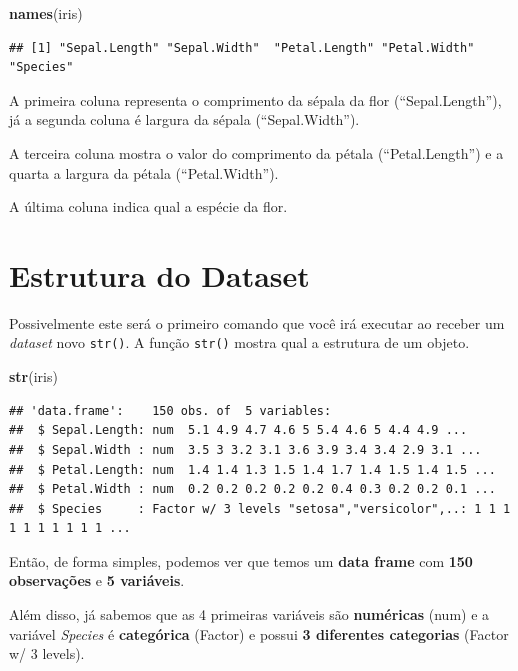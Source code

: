 \documentclass[
]{book}
\newenvironment{Shaded}{\begin{snugshade}}{\end{snugshade}}
\newcommand{\KeywordTok}[1]{\textcolor[rgb]{0.13,0.29,0.53}{\textbf{#1}}}
\newcommand{\NormalTok}[1]{#1}
\begin{document}
\begin{Shaded}
\begin{Highlighting}[]
\KeywordTok{names}\NormalTok{(iris)}
\end{Highlighting}
\end{Shaded}

\begin{verbatim}
## [1] "Sepal.Length" "Sepal.Width"  "Petal.Length" "Petal.Width"  "Species"
\end{verbatim}

A primeira coluna representa o comprimento da sépala da flor
(``Sepal.Length''), já a segunda coluna é largura da sépala
(``Sepal.Width'').

A terceira coluna mostra o valor do comprimento da pétala
(``Petal.Length'') e a quarta a largura da pétala (``Petal.Width'').

A última coluna indica qual a espécie da flor.

\hypertarget{estrutura-do-dataset}{%
\section{Estrutura do Dataset}\label{estrutura-do-dataset}}

Possivelmente este será o primeiro comando que você irá executar ao
receber um \emph{dataset} novo \texttt{str()}. A função \texttt{str()}
mostra qual a estrutura de um objeto.

\begin{Shaded}
\begin{Highlighting}[]
\KeywordTok{str}\NormalTok{(iris)}
\end{Highlighting}
\end{Shaded}

\begin{verbatim}
## 'data.frame':    150 obs. of  5 variables:
##  $ Sepal.Length: num  5.1 4.9 4.7 4.6 5 5.4 4.6 5 4.4 4.9 ...
##  $ Sepal.Width : num  3.5 3 3.2 3.1 3.6 3.9 3.4 3.4 2.9 3.1 ...
##  $ Petal.Length: num  1.4 1.4 1.3 1.5 1.4 1.7 1.4 1.5 1.4 1.5 ...
##  $ Petal.Width : num  0.2 0.2 0.2 0.2 0.2 0.4 0.3 0.2 0.2 0.1 ...
##  $ Species     : Factor w/ 3 levels "setosa","versicolor",..: 1 1 1 1 1 1 1 1 1 1 ...
\end{verbatim}

Então, de forma simples, podemos ver que temos um \textbf{data frame}
com \textbf{150 observações} e \textbf{5 variáveis}.

Além disso, já sabemos que as 4 primeiras variáveis são
\textbf{numéricas} (num) e a variável \emph{Species} é
\textbf{categórica} (Factor) e possui \textbf{3 diferentes categorias}
(Factor w/ 3 levels).
\end{document}
